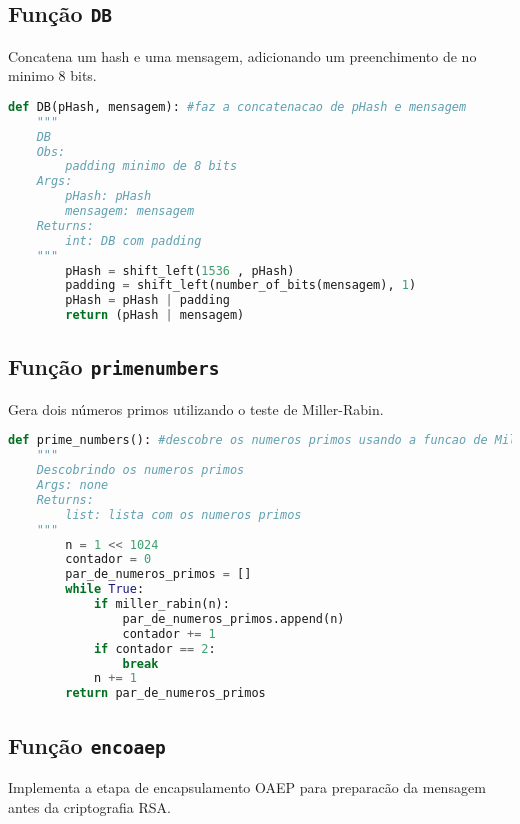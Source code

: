 \documentclass{article}
\begin{document}
\subsection{Função \texttt{DB}}
Concatena um hash  e uma mensagem, adicionando um preenchimento de no minimo 8 bits.

\begin{lstlisting}[language=Python]
    def DB(pHash, mensagem): #faz a concatenacao de pHash e mensagem
    """
    DB
    Obs:
        padding minimo de 8 bits
    Args:
        pHash: pHash
        mensagem: mensagem
    Returns:
        int: DB com padding
    """
        pHash = shift_left(1536 , pHash)
        padding = shift_left(number_of_bits(mensagem), 1)
        pHash = pHash | padding
        return (pHash | mensagem)
    \end{lstlisting}

\subsection{Função \texttt{prime\textunderscore numbers}}
Gera dois números primos utilizando o teste de Miller-Rabin.

\begin{lstlisting}[language=Python]
    def prime_numbers(): #descobre os numeros primos usando a funcao de Miller-Rabin
    """
    Descobrindo os numeros primos
    Args: none
    Returns:
        list: lista com os numeros primos
    """
        n = 1 << 1024
        contador = 0
        par_de_numeros_primos = []
        while True:
            if miller_rabin(n):
                par_de_numeros_primos.append(n)
                contador += 1
            if contador == 2:
                break
            n += 1
        return par_de_numeros_primos
    \end{lstlisting}

\subsection{Função \texttt{enc\textunderscore oaep}}
Implementa a etapa de encapsulamento OAEP para preparacão da mensagem antes da criptografia RSA.
\end{document}
